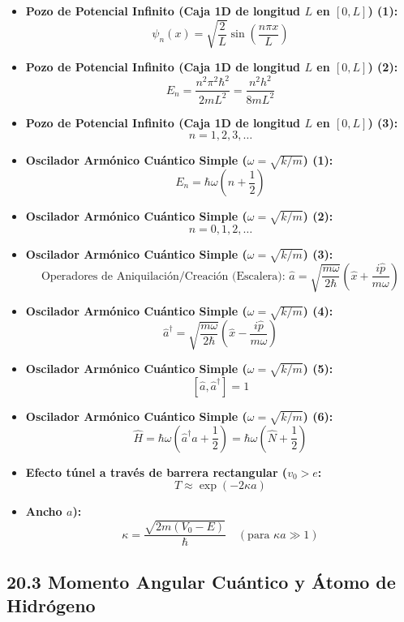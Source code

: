 \documentclass[11pt,a4paper]{article}
\begin{document}
\begin{itemize}
  \item \textbf{Pozo de Potencial Infinito (Caja 1D de longitud $L$ en $[0, L]$) (1):}
  \[
    \psi_n(x) = \sqrt{\frac{2}{L}}\sin\left( \frac{n\pi x}{L} \right)
  \]
  \item \textbf{Pozo de Potencial Infinito (Caja 1D de longitud $L$ en $[0, L]$) (2):}
  \[
    E_n = \frac{n^2 \pi^2 \hbar^2}{2m L^2} = \frac{n^2 h^2}{8m L^2}
  \]
  \item \textbf{Pozo de Potencial Infinito (Caja 1D de longitud $L$ en $[0, L]$) (3):}
  \[
    n = 1, 2, 3, \dots
  \]
  \item \textbf{Oscilador Armónico Cuántico Simple ($\omega = \sqrt{k/m}$) (1):}
  \[
    E_n = \hbar\omega \left( n + \frac{1}{2} \right)
  \]
  \item \textbf{Oscilador Armónico Cuántico Simple ($\omega = \sqrt{k/m}$) (2):}
  \[
    n = 0, 1, 2, \dots
  \]
  \item \textbf{Oscilador Armónico Cuántico Simple ($\omega = \sqrt{k/m}$) (3):}
  \[
    \text{Operadores de Aniquilación/Creación (Escalera): } \hat{a} = \sqrt{\frac{m\omega}{2\hbar}}\left(\hat{x} + \frac{i\hat{p}}{m\omega}\right)
  \]
  \item \textbf{Oscilador Armónico Cuántico Simple ($\omega = \sqrt{k/m}$) (4):}
  \[
    \hat{a}^\dagger = \sqrt{\frac{m\omega}{2\hbar}}\left(\hat{x} - \frac{i\hat{p}}{m\omega}\right)
  \]
  \item \textbf{Oscilador Armónico Cuántico Simple ($\omega = \sqrt{k/m}$) (5):}
  \[
    [\hat{a}, \hat{a}^\dagger] = 1
  \]
  \item \textbf{Oscilador Armónico Cuántico Simple ($\omega = \sqrt{k/m}$) (6):}
  \[
    \hat{H} = \hbar\omega\left(\hat{a}^\dagger \hat{a} + \frac{1}{2}\right) = \hbar\omega\left(\hat{N} + \frac{1}{2}\right)
  \]
  \item \textbf{Efecto túnel a través de barrera rectangular ($v_0 > e$:}
  \[
    T \approx \exp(-2\kappa a)
  \]
  \item \textbf{Ancho $a$):}
  \[
    \kappa = \frac{\sqrt{2m(V_0 - E)}}{\hbar} \quad (\text{para } \kappa a \gg 1)
  \]
\end{itemize}

\subsection*{20.3 Momento Angular Cuántico y Átomo de Hidrógeno}
\end{document}
